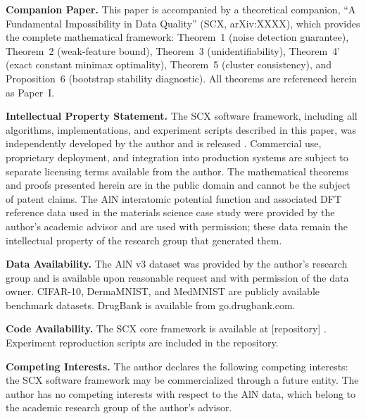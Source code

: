 \documentclass[12pt,a4paper]{article}
\begin{document}
\begin{flushleft}
\textbf{Companion Paper.} This paper is accompanied by a theoretical companion, ``A Fundamental Impossibility in Data Quality'' (SCX, arXiv:XXXX), which provides the complete mathematical framework: Theorem~1 (noise detection guarantee), Theorem~2 (weak-feature bound), Theorem~3 (unidentifiability), Theorem~4' (exact constant minimax optimality), Theorem~5 (cluster consistency), and Proposition~6 (bootstrap stability diagnostic). All theorems are referenced herein as Paper~I.

\end{flushleft}




\textbf{Intellectual Property Statement.}
The SCX software framework, including all algorithms, implementations, and experiment scripts described in this paper, was independently developed by the author and is released . Commercial use, proprietary deployment, and integration into production systems are subject to separate licensing terms available from the author. The mathematical theorems and proofs presented herein are in the public domain and cannot be the subject of patent claims. The AlN interatomic potential function and associated DFT reference data used in the materials science case study were provided by the author's academic advisor and are used with permission; these data remain the intellectual property of the research group that generated them.

\textbf{Data Availability.}
The AlN v3 dataset was provided by the author's research group and is available upon reasonable request and with permission of the data owner. CIFAR-10, DermaMNIST, and MedMNIST are publicly available benchmark datasets. DrugBank is available from go.drugbank.com.

\textbf{Code Availability.}
The SCX core framework is available at [repository] . Experiment reproduction scripts are included in the repository.

\textbf{Competing Interests.}
The author declares the following competing interests: the SCX software framework may be commercialized through a future entity. The author has no competing interests with respect to the AlN data, which belong to the academic research group of the author's advisor.
\end{document}
